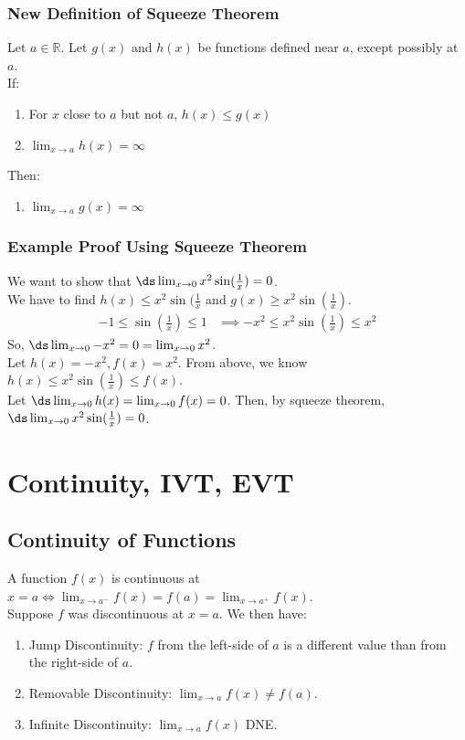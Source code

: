 \documentclass{article}
\begin{document}
\subsubsection{New Definition of Squeeze Theorem}
Let $a \in \mathbb{R}$. Let $g(x)$ and $h(x)$ be functions defined near $a$, except possibly at $a$.\\
If:
\begin{enumerate}
    \item For $x$ close to $a$ but not $a$, $h(x) \leq g(x)$
    \item $\lim_{x \to a} h(x) = \infty$
\end{enumerate}
Then:
\begin{enumerate}
    \item $\lim_{x\to a} g(x) = \infty$
\end{enumerate}
\subsubsection{Example Proof Using Squeeze Theorem}
We want to show that $\ds \lim_{x \to 0} x^2\sin(\frac{1}{x}) = 0$.\\
We have to find $h(x) \leq x^2\sin(\frac{1}{x}$ and $g(x) \geq x^2\sin(\frac{1}{x})$.
\begin{align*}
-1 \leq \sin(\frac{1}{x}) \leq 1 & \implies -x^2 \leq x^2 \sin(\frac{1}{x}) \leq x^2
\end{align*}
So, $\ds \lim_{x \to 0} -x^2 = 0 = \lim_{x \to 0} x^2$.\\
Let $h(x) = -x^2, f(x) = x^2$. From above, we know $h(x) \leq x^2\sin(\frac{1}{x}) \leq f(x)$.\\
Let $\ds \lim_{x \to 0} h(x) = \lim_{x \to 0} f(x) = 0$. Then, by squeeze theorem,  $\ds \lim_{x \to 0} x^2\sin(\frac{1}{x}) = 0$.

\newpage
\section{Continuity, IVT, EVT}
\subsection{Continuity of Functions}
A function $f(x)$ is continuous at $x = a \iff \lim_{x \to a^-} f(x) = f(a) = \lim_{x \to a^+} f(x)$.\\
Suppose $f$ was discontinuous at $x = a$. We then have:
\begin{enumerate}
    \item Jump Discontinuity: $f$ from the left-side of $a$ is a different value than from the right-side of $a$.
    \item Removable Discontinuity: $\lim_{x \to a} f(x) \neq f(a)$.
    \item Infinite Discontinuity: $\lim_{x \to a} f(x)$ DNE.
\end{enumerate}
\end{document}
